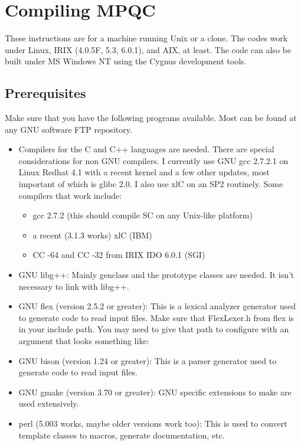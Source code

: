 
\chapter{Compiling MPQC}


These instructions are for a machine running Unix or a clone. The codes
work under Linux, IRIX (4.0.5F, 5.3, 6.0.1), and AIX, at least.  The code
can also be built under MS Windows NT using the Cygnus development tools.

\section{Prerequisites}
 Make sure that you have the following programs available. Most can be
found at any GNU software FTP repository.
  \begin{itemize}
    \item Compilers for the C and C++ languages are needed.  There are
          special considerations for non GNU compilers. I currently use GNU
          gcc 2.7.2.1 on Linux Redhat 4.1 with a recent kernel and a few
          other updates, most important of which is glibc 2.0. I also use
          xlC on an SP2 routinely. Some compilers that work include:
      \begin{itemize}
        \item  gcc 2.7.2 (this should compile SC on any Unix-like platform)
        \item  a recent (3.1.3 works) xlC (IBM)
        \item  CC -64 and CC -32 from IRIX IDO 6.0.1 (SGI)
      \end{itemize}
    \item GNU libg++: Mainly genclass and the prototype classes are needed.
          It isn't necessary to link with libg++.
    \item GNU flex (version 2.5.2 or greater): This is a lexical analyzer
          generator used to generate code to read input files. Make sure that
          FlexLexer.h from flex is in your include path. You may need to
          give that path to configure with an argument that looks something
          like: 
    \item GNU bison (version 1.24 or greater): This is a parser generator used
          to generate code to read input files.
    \item GNU gmake (version 3.70 or greater): GNU specific extensions to make
          are used extensively.
    \item perl (5.003 works, maybe older versions work too): This is used to
          convert template classes to macros, generate documentation, etc.
  \end{itemize}

